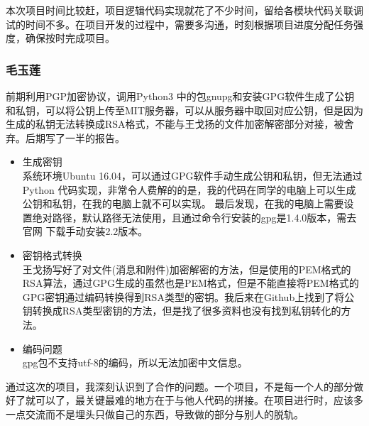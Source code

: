 \documentclass[a4paper,UTF8]{article}
\begin{document}
本次项目时间比较赶，项目逻辑代码实现就花了不少时间，留给各模块代码关联调试的时间不多。在项目开发的过程中，需要多沟通，时刻根据项目进度分配任务强度，确保按时完成项目。

\subsubsection{毛玉莲}
前期利用PGP加密协议，调用Python3 中的包gnupg和安装GPG软件生成了公钥和私钥，可以将公钥上传至MIT服务器，可以从服务器中取回对应公钥，但是因为生成的私钥无法转换成RSA格式，不能与王戈扬的文件加密解密部分对接，被舍弃。后期写了一半的报告。
	
	\begin{itemize}
		\item 生成密钥\\系统环境Ubuntu 16.04，可以通过GPG软件手动生成公钥和私钥，但无法通过Python 代码实现，非常令人费解的的是，我的代码在同学的电脑上可以生成公钥和私钥，在我的电脑上就不可以实现。
		最后发现，在我的电脑上需要设置绝对路径，默认路径无法使用，且通过命令行安装的gpg是1.4.0版本，需去官网
		下载手动安装2.2版本。
		\item 密钥格式转换\\ 王戈扬写好了对文件(消息和附件)加密解密的方法，但是使用的PEM格式的RSA算法，通过GPG生成的虽然也是PEM格式，但是不能直接将PEM格式的GPG密钥通过编码转换得到RSA类型的密钥。我后来在Github上找到了将公钥转换成RSA类型密钥的方法，但是找了很多资料也没有找到私钥转化的方法。
		\item 编码问题\\ gpg包不支持utf-8的编码，所以无法加密中文信息。
	\end{itemize}

通过这次的项目，我深刻认识到了合作的问题。一个项目，不是每一个人的部分做好了就可以了，最关键最难的地方在于与他人代码的拼接。在项目进行时，应该多一点交流而不是埋头只做自己的东西，导致做的部分与别人的脱轨。
\end{document}
